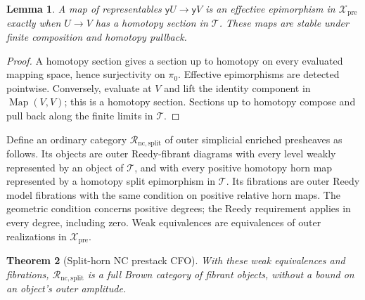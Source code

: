 \documentclass[12pt]{amsart}
\newtheorem{thm}{Theorem}[section]
\newtheorem{lem}[thm]{Lemma}
\theoremstyle{definition}
\theoremstyle{remark}
\numberwithin{equation}{section}
\newcommand{\y}{\mathsf y}
\DeclareMathOperator{\Map}{Map}
\begin{document}
\begin{lem}\label{lem:nc-split-cover}
A map of representables $\y U\to\y V$ is an effective epimorphism
in $\mathcal X_{\mathrm{pre}}$ exactly when $U\to V$ has a
homotopy section in $\mathcal T$. These maps are stable under
finite composition and homotopy pullback.
\end{lem}

\begin{proof}
A homotopy section gives a section up to homotopy on every
evaluated mapping space, hence surjectivity on $\pi_0$. Effective
epimorphisms are detected pointwise. Conversely, evaluate at $V$
and lift the identity component in $\Map(V,V)$; this is a homotopy
section. Sections up to homotopy compose and pull back along the
finite limits in $\mathcal T$.
\end{proof}

Define an ordinary category $\mathscr R_{\mathrm{nc,split}}$ of
outer simplicial enriched presheaves as follows. Its objects are
outer Reedy-fibrant diagrams with every level weakly represented
by an object of $\mathcal T$, and with every positive homotopy
horn map represented by a homotopy split epimorphism in
$\mathcal T$. Its fibrations are outer Reedy model fibrations with
the same condition on positive relative horn maps. The geometric
condition concerns positive degrees; the Reedy requirement
applies in every degree, including zero. Weak
equivalences are equivalences of outer realizations in
$\mathcal X_{\mathrm{pre}}$.

\begin{thm}[Split-horn NC prestack CFO]\label{thm:nc-prestack-cfo}
With these weak equivalences and fibrations,
$\mathscr R_{\mathrm{nc,split}}$ is a full Brown category of
fibrant objects, without a bound on an object's outer amplitude.
\end{thm}
\end{document}
